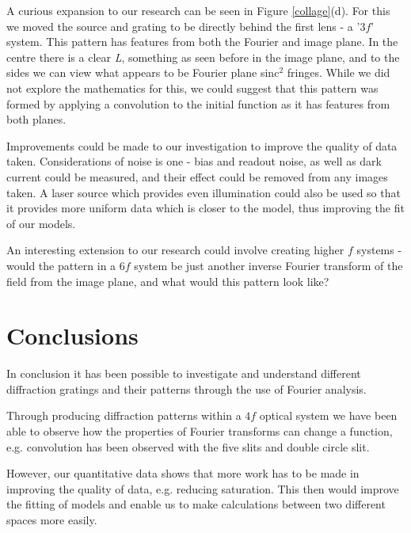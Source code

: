 \documentclass[twocolumn]{revtex4}
\begin{document}
A curious expansion to our research can be seen in Figure \ref{collage}(d). For this we moved the source and grating to be directly behind the first lens - a '$3f$' system. This pattern has features from both the Fourier and image plane. In the centre there is a clear \textit{L}, something as seen before in the image plane, and to the sides we can view what appears to be Fourier plane sinc$^2$ fringes. While we did not explore the mathematics for this, we could suggest that this pattern was formed by applying a convolution to the initial function as it has features from both planes.

Improvements could be made to our investigation to improve the quality of data taken. Considerations of noise is one - bias and readout noise, as well as dark current could be measured, and their effect could be removed from any images taken. A laser source which provides even illumination could also be used so that it provides more uniform data which is closer to the model, thus improving the fit of our models.

An interesting extension to our research could involve creating higher $f$ systems - would the pattern in a $6f$ system be just another inverse Fourier transform of the field from the image plane, and what would this pattern look like?

\vspace{-5ex}
\section{Conclusions}
\vspace{-2ex}

In conclusion it has been possible to investigate and understand different diffraction gratings and their patterns through the use of Fourier analysis.

Through producing diffraction patterns within a $4f$ optical system we have been able to observe how the properties of Fourier transforms can change a function, e.g. convolution has been observed with the five slits and double circle slit.

However, our quantitative data shows that more work has to be made in improving the quality of data, e.g. reducing saturation. This then would improve the fitting of models and enable us to make calculations between two different spaces more easily.
\end{document}
